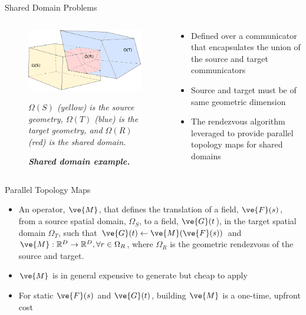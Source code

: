 \documentclass{beamer}
\begin{document}
\begin{frame}{Shared Domain Problems}

  \begin{columns}
    
    \begin{column}{0.5\textwidth}
      \begin{figure}[htpb!]
        \centering \includegraphics[width=2.5in]{overlapping_domain.pdf}
        \caption{\bf \sl Shared domain example.} {\sl $\Omega(S)$ (yellow)
          is the source geometry, $\Omega(T)$ (blue) is the target geometry,
          and $\Omega(R)$ (red) is the shared domain.}
        \label{fig:shared_domain}
      \end{figure}
    \end{column}

    \begin{column}{0.5\textwidth}
      \begin{itemize}
      \item Defined over a communicator that encapsulates the union of
        the source and target communicators
        \medskip
      \item Source and target must be of same geometric dimension
        \medskip
      \item The rendezvous algorithm leveraged to provide parallel
        topology maps for shared domains
      \end{itemize}
    \end{column}

  \end{columns}

\end{frame}

\begin{frame}{Parallel Topology Maps}

  \begin{itemize}
  \item An operator, $\ve{M}$, that defines the translation of a
    field, $\ve{F}(s)$, from a source spatial domain, $\Omega_S$, to a
    field, $\ve{G}(t$), in the target spatial domain $\Omega_T$, such
    that $\ve{G}(t)\leftarrow \ve{M}(\ve{F}(s))$ and $\ve{M}:
    \mathbb{R}^D \rightarrow \mathbb{R}^D, \forall r \in \Omega_R$,
    where $\Omega_R$ is the geometric rendezvous of the source and
    target.
    \medskip
  \item $\ve{M}$ is in general expensive to generate but cheap to
    apply
  \item For static $\ve{F}(s)$ and $\ve{G}(t)$, building $\ve{M}$ is a
    one-time, upfront cost
  \end{itemize}

\end{frame}
\end{document}
